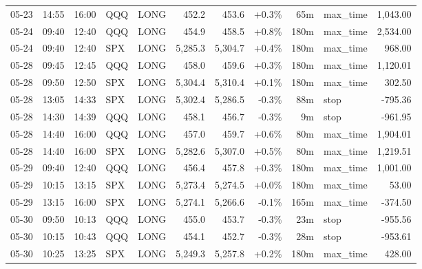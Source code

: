 \documentclass[11pt,a4paper,twoside]{article}
\begin{document}
\begin{center}
\begin{longtable}{>{\color{txtmain}}l l l l l r r r r >{\color{txtmain}}l r}
05-23 & 14:55 & 16:00 & QQQ & LONG & 452.2 & 453.6 & \textcolor{wingreen}{+0.3\%} & 65m & max\_time & \textcolor{wingreen}{1,043.00} \\
05-24 & 09:40 & 12:40 & QQQ & LONG & 454.9 & 458.5 & \textcolor{wingreen}{+0.8\%} & 180m & max\_time & \textcolor{wingreen}{2,534.00} \\
05-24 & 09:40 & 12:40 & SPX & LONG & 5,285.3 & 5,304.7 & \textcolor{wingreen}{+0.4\%} & 180m & max\_time & \textcolor{wingreen}{968.00} \\
05-28 & 09:45 & 12:45 & QQQ & LONG & 458.0 & 459.6 & \textcolor{wingreen}{+0.3\%} & 180m & max\_time & \textcolor{wingreen}{1,120.01} \\
05-28 & 09:50 & 12:50 & SPX & LONG & 5,304.4 & 5,310.4 & \textcolor{wingreen}{+0.1\%} & 180m & max\_time & \textcolor{wingreen}{302.50} \\
05-28 & 13:05 & 14:33 & SPX & LONG & 5,302.4 & 5,286.5 & \textcolor{lossred}{-0.3\%} & 88m & stop & \textcolor{lossred}{-795.36} \\
05-28 & 14:30 & 14:39 & QQQ & LONG & 458.1 & 456.7 & \textcolor{lossred}{-0.3\%} & 9m & stop & \textcolor{lossred}{-961.95} \\
05-28 & 14:40 & 16:00 & QQQ & LONG & 457.0 & 459.7 & \textcolor{wingreen}{+0.6\%} & 80m & max\_time & \textcolor{wingreen}{1,904.01} \\
05-28 & 14:40 & 16:00 & SPX & LONG & 5,282.6 & 5,307.0 & \textcolor{wingreen}{+0.5\%} & 80m & max\_time & \textcolor{wingreen}{1,219.51} \\
05-29 & 09:40 & 12:40 & QQQ & LONG & 456.4 & 457.8 & \textcolor{wingreen}{+0.3\%} & 180m & max\_time & \textcolor{wingreen}{1,001.00} \\
05-29 & 10:15 & 13:15 & SPX & LONG & 5,273.4 & 5,274.5 & \textcolor{wingreen}{+0.0\%} & 180m & max\_time & \textcolor{wingreen}{53.00} \\
05-29 & 13:15 & 16:00 & SPX & LONG & 5,274.1 & 5,266.6 & \textcolor{lossred}{-0.1\%} & 165m & max\_time & \textcolor{lossred}{-374.50} \\
05-30 & 09:50 & 10:13 & QQQ & LONG & 455.0 & 453.7 & \textcolor{lossred}{-0.3\%} & 23m & stop & \textcolor{lossred}{-955.56} \\
05-30 & 10:15 & 10:43 & QQQ & LONG & 454.1 & 452.7 & \textcolor{lossred}{-0.3\%} & 28m & stop & \textcolor{lossred}{-953.61} \\
05-30 & 10:25 & 13:25 & SPX & LONG & 5,249.3 & 5,257.8 & \textcolor{wingreen}{+0.2\%} & 180m & max\_time & \textcolor{wingreen}{428.00} \\

\end{longtable}
\end{center}
\end{document}
